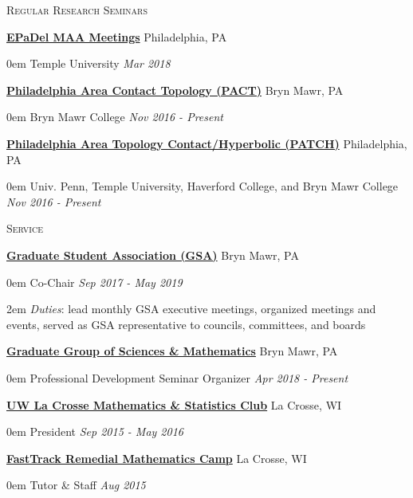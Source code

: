 \documentclass[11pt]{article}
\newenvironment{headitem}[2]{\hspace{.5em} \textbf{#1} \hfill #2 \begin{addmargin}[0em]{0em}}{\end{addmargin}}
\renewenvironment{section}[1]{\textsc{\large #1} \vskip5pt}{\vskip10pt}
\newcommand{\itemreg}[1]{\begin{addmargin}[.75em]{2em} #1 \end{addmargin}}
\newcommand{\itemdate}[2]{\hspace{.5em} #1 \hfill \textit{#2} \\}
\begin{document}
\begin{section}{Regular Research Seminars}
	
	\begin{headitem}{\href{http://sections.maa.org/epadel/}{EPaDel MAA Meetings}}{Philadelphia, PA}
		\itemdate{Temple University}{Mar 2018}
	\end{headitem}
	\vskip5pt
	
	\begin{headitem}{\href{https://www.brynmawr.edu/math/pact-seminar}{Philadelphia Area Contact Topology (PACT)}}{Bryn Mawr, PA}
		\itemdate{Bryn Mawr College}{Nov 2016 - Present}
	\end{headitem}
	\vskip5pt
	
	\begin{headitem}{\href{https://math.temple.edu/events/seminars/geometry/}{Philadelphia Area Topology Contact/Hyperbolic (PATCH)}}{Philadelphia, PA}
		\itemdate{Univ. Penn, Temple University, Haverford College, and Bryn Mawr College}{Nov 2016 - Present}
	\end{headitem}
	
\end{section}



\begin{section}{Service}

	\begin{headitem}{\href{https://www.brynmawr.edu/gsas/}{Graduate Student Association (GSA)}}{Bryn Mawr, PA}
		\itemdate{Co-Chair}{Sep 2017 - May 2019}
		\itemreg{\textit{Duties}: lead monthly GSA executive meetings, organized meetings and events, served as GSA representative to councils, committees, and boards}
	\end{headitem}
	\vskip5pt
	
	\begin{headitem}{\href{https://www.brynmawr.edu/ggsm}{Graduate Group of Sciences \& Mathematics}}{Bryn Mawr, PA}
		\itemdate{Professional Development Seminar Organizer}{Apr 2018 - Present}
	\end{headitem}
	\vskip5pt
	
	\begin{headitem}{\href{https://www.uwlax.edu/mathematics/activities/mathematics-and-stats-club/}{UW La Crosse Mathematics \& Statistics Club}}{La Crosse, WI}
		\itemdate{President}{Sep 2015 - May 2016}
	\end{headitem}
	\vskip5pt
	
	\begin{headitem}{\href{https://www.uwlax.edu/mathematics/fasttrack/}{FastTrack Remedial Mathematics Camp}}{La Crosse, WI}
		\itemdate{Tutor \& Staff}{Aug 2015}
	\end{headitem}
	
\end{section}
\end{document}
